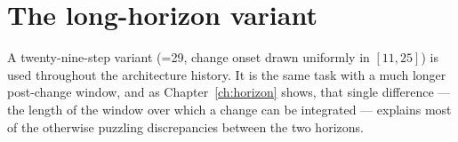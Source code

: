 \section{The long-horizon variant}
A twenty-nine-step variant (=29, change onset drawn uniformly in $[11,25]$) is used
throughout the architecture history. It is the same task with a much longer post-change
window, and as Chapter~\ref{ch:horizon} shows, that single difference --- the length of the
window over which a change can be integrated --- explains most of the otherwise puzzling
discrepancies between the two horizons.

